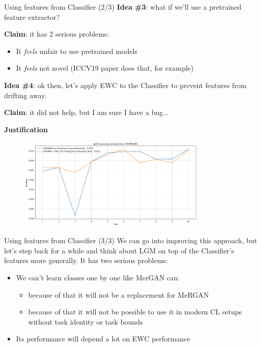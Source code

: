 \documentclass[10pt]{beamer}
\begin{document}
\begin{frame}{Using features from Classifier (2/3)}
    \pause
    \textbf{Idea \#3}: what if we'll use a pretrained feature extractor?
    
    \pause
    \textbf{Claim}: it has 2 serious problems:
    \begin{itemize}
        \item\pause It \textit{feels} unfair to use pretrained models
        \item\pause It \textit{feels} not novel (ICCV19 paper does that, for example)
    \end{itemize}
    
    \pause
    \textbf{Idea \#4}: ok then, let's apply EWC to the Classifier to prevent features from drifting away.
    
    \pause
    \textbf{Claim}: it did not help, but I am sure I have a bug...
    
    \pause
    \textbf{Justification}
    \begin{figure}
        \centering
        \includegraphics[width=0.8\textwidth]{images/lgm-mem-with-and-without-ewc.png}
    \end{figure}
\end{frame}

\begin{frame}{Using features from Classifier (3/3)}
    We can go into improving this approach, but let's step back for a while and think about LGM on top of the Classifier's features more generally. It has two serious problems:
    \begin{itemize}
        \item\pause We can't learn classes one by one like MerGAN can:
        \begin{itemize}
            \item\pause because of that it will not be a replacement for MeRGAN
            \item\pause because of that it will not be possible to use it in modern CL setups without task identity or task bounds
        \end{itemize}
        \item\pause Its performance will depend a lot on EWC performance
    \end{itemize}
\end{frame}
\end{document}
